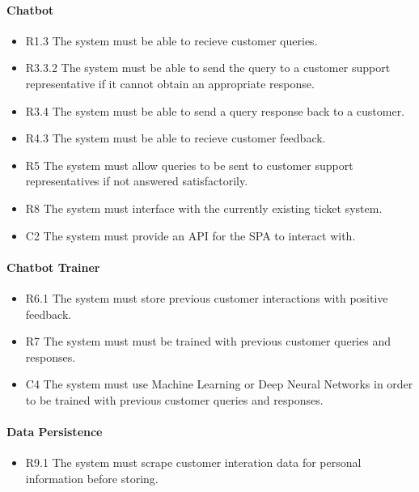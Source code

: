 \documentclass[11pt]{article}
\begin{document}
\paragraph{Chatbot}
\begin{itemize}
  \item[] R1.3 The system must be able to recieve customer queries.
  \item[] R3.3.2 The system must be able to send the query to a customer support representative if it cannot obtain an appropriate response.
  \item[] R3.4 The system must be able to send a query response back to a customer.
  \item[] R4.3 The system must be able to recieve customer feedback.
  \item[] R5 The system must allow queries to be sent to customer support representatives if not answered satisfactorily.
  \item[] R8 The system must interface with the currently existing ticket system.
  \item[] C2 The system must provide an API for the SPA to interact with.
\end{itemize}

\paragraph{Chatbot Trainer}
\begin{itemize}
  \item[] R6.1 The system must store previous customer interactions with positive feedback.
  \item[] R7 The system must must be trained with previous customer queries and responses.
  \item[] C4 The system must use Machine Learning or Deep Neural Networks in order to be trained with previous customer queries and responses.
\end{itemize}

\paragraph{Data Persistence}
\begin{itemize}
  \item[] R9.1 The system must scrape customer interation data for personal information before storing.
\end{itemize}
\end{document}
